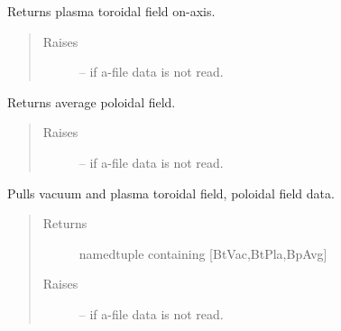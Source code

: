 \documentclass[letterpaper,10pt,english]{sphinxmanual}
\begin{document}
\begin{fulllineitems}
\begin{fulllineitems}
\end{fulllineitems}


\begin{fulllineitems}
\label{eqtools:eqtools.eqdskreader.EqdskReader.getBtPla}
Returns plasma toroidal field on-axis.
\begin{quote}\begin{description}
\item[{Raises}] \leavevmode
{} -- if a-file data is not read.

\end{description}\end{quote}

\end{fulllineitems}


\begin{fulllineitems}
\label{eqtools:eqtools.eqdskreader.EqdskReader.getBpAvg}
Returns average poloidal field.
\begin{quote}\begin{description}
\item[{Raises}] \leavevmode
{} -- if a-file data is not read.

\end{description}\end{quote}

\end{fulllineitems}


\begin{fulllineitems}
\label{eqtools:eqtools.eqdskreader.EqdskReader.getFields}
Pulls vacuum and plasma toroidal field, poloidal field data.
\begin{quote}\begin{description}
\item[{Returns}] \leavevmode
namedtuple containing {[}BtVac,BtPla,BpAvg{]}

\item[{Raises}] \leavevmode
{} -- if a-file data is not read.

\end{description}\end{quote}


\end{fulllineitems}
\end{fulllineitems}
\end{document}
